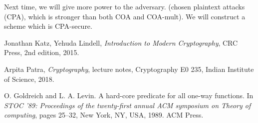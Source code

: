 \documentclass[11pt]{article}
\begin{document}
Next time, we will give more power to the adversary. (chosen plaintext attacks (CPA), which is stronger than both COA and COA-mult). We will construct a scheme which is CPA-secure.


\begin{thebibliography}{9}

  Jonathan Katz, Yehuda Lindell,
  \emph{Introduction to Modern Cryptography},
  CRC Press,
  2nd edition,
  2015.
  
  Arpita Patra,  
  \emph{Cryptography}, lecture notes, Cryptography E0 235,
  Indian Institute of Science, 2018.
  
  O. Goldreich and L. A. Levin. A hard-core predicate for all one-way functions. In
\emph{STOC ’89: Proceedings of the twenty-first annual ACM symposium on Theory of
computing}, pages 25--32, New York, NY, USA, 1989. ACM Press.
\end{thebibliography}
\end{document}
